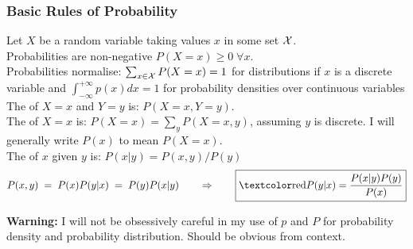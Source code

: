 \begin{frame}
\frametitle{Basic Rules of Probability}

\vspace*{-2ex}
Let $X$ be a random variable taking values $x$ in some set $\cal X$.\\

Probabilities are non-negative $P(X=x)\geq 0\;\forall x$.\\

Probabilities normalise: $\sum_{x \in {\cal X}} P(X=x)=1$ for distributions if $x$ is a
discrete variable and $\int_{-\infty}^{+\infty} p(x)dx=1$ for
probability densities over continuous variables\\[2ex]

The  of $X=x$ and $Y=y$ is: $P(X=x,Y=y)$.\\

The  of $X=x$ is: $P(X=x) = \sum_y P(X=x,y)$,
assuming $y$ is discrete. I will generally write $P(x)$ to mean
$P(X=x)$.\\ 

The  of $x$ given $y$ is:
$P(x|y)=P(x,y)/P(y)$ \\[2ex]

 \vspace*{-3ex}
\begin{equation*}
P(x,y)\;=\;P(x)P(y|x)\;=\;P(y)P(x|y)\qquad \Rightarrow \qquad
\fbox{\Red{$\displaystyle P(y|x) = \frac{P(x|y) P(y)}{P(x)}$}}
\end{equation*}

\vspace*{-1ex}

{\small {\bf Warning:} I will not be obsessively careful in my use of $p$
and $P$ for probability density and probability distribution. Should
be obvious from context.} 

\end{frame}
